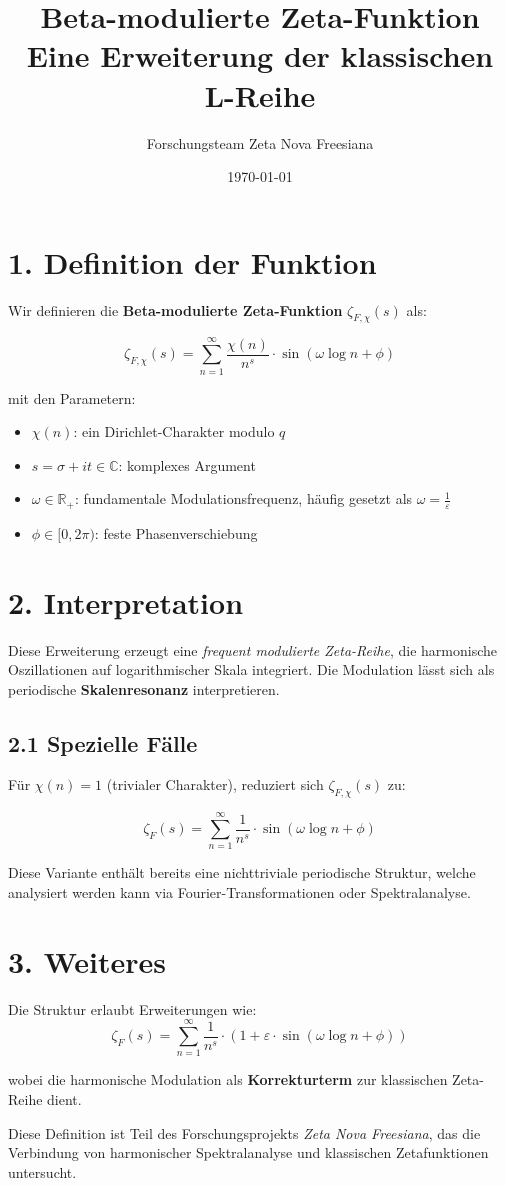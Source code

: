 \documentclass[a4paper,11pt]{article}
\title{Beta-modulierte Zeta-Funktion \\ \large Eine Erweiterung der klassischen L-Reihe}
\author{Forschungsteam Zeta Nova Freesiana}
\date{\today}
\begin{document}
\maketitle

\section*{1. Definition der Funktion}

Wir definieren die \textbf{Beta-modulierte Zeta-Funktion} \( \zeta_{F,\chi}(s) \) als:

\[
\zeta_{F,\chi}(s) = \sum_{n=1}^{\infty} \frac{\chi(n)}{n^s} \cdot \sin(\omega \log n + \phi)
\]

\noindent mit den Parametern:
\begin{itemize}
  \item \( \chi(n) \): ein Dirichlet-Charakter modulo \( q \)
  \item \( s = \sigma + it \in \mathbb{C} \): komplexes Argument
  \item \( \omega \in \mathbb{R}_{+} \): fundamentale Modulationsfrequenz, häufig gesetzt als \( \omega = \frac{1}{\varepsilon} \)
  \item \( \phi \in [0, 2\pi) \): feste Phasenverschiebung
\end{itemize}

\section*{2. Interpretation}

Diese Erweiterung erzeugt eine \textit{frequent modulierte Zeta-Reihe}, die harmonische Oszillationen auf logarithmischer Skala integriert. Die Modulation lässt sich als periodische \textbf{Skalenresonanz} interpretieren.

\subsection*{2.1 Spezielle Fälle}
Für \( \chi(n) = 1 \) (trivialer Charakter), reduziert sich \( \zeta_{F,\chi}(s) \) zu:

\[
\zeta_{F}(s) = \sum_{n=1}^{\infty} \frac{1}{n^s} \cdot \sin(\omega \log n + \phi)
\]

Diese Variante enthält bereits eine nichttriviale periodische Struktur, welche analysiert werden kann via Fourier-Transformationen oder Spektralanalyse.

\section*{3. Weiteres}

Die Struktur erlaubt Erweiterungen wie:
\[
\zeta_{F}(s) = \sum_{n=1}^{\infty} \frac{1}{n^s} \cdot \left(1 + \varepsilon \cdot \sin(\omega \log n + \phi)\right)
\]

\noindent wobei die harmonische Modulation als \textbf{Korrekturterm} zur klassischen Zeta-Reihe dient.

\vfill
\hrulefill

\noindent\footnotesize
Diese Definition ist Teil des Forschungsprojekts \emph{Zeta Nova Freesiana}, das die Verbindung von harmonischer Spektralanalyse und klassischen Zetafunktionen untersucht.
\end{document}
